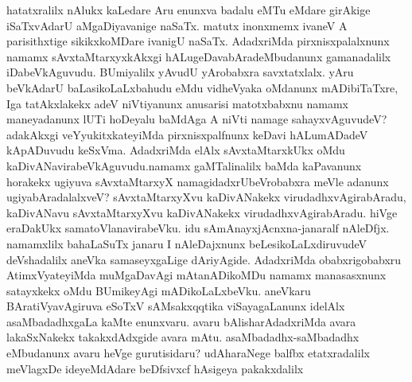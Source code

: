 hatatxralilx nAlukx kaLedare Aru enunxva badalu eMTu eMdare girAkige iSaTxvAdarU aMgaDiyavanige naSaTx. matutx inonxmemx ivaneV A pari\-sithxtige sikikx\-koMDare ivanigU naSaTx. AdadxriMda pirxnisxpalalxnunx namamx sAvxtaMtarxyx\-kAkxgi hALugeDavabAradeMbudanunx gamanadalilx iDabeVkAguvudu. BUmiyalilx yAvudU yArobabxra savxtatxlalx. yAru beVkAdarU baLasi\-koLaLx\-bahudu eMdu vidheVyaka oMdanunx mADibiTaTxre, Iga tatAkxlakekx adeV niVtiyanunx anu\-sarisi matotx\-babxnu namamx maneyadanunx lUTi hoDeyalu baMdAga A niVti namage sahayxvAgu\-vudeV? adakAkxgi veYyukitxkateyiMda pirxnisxpalfnunx keDavi hALumADadeV kApADu\-vudu keSxVma. AdadxriMda elAlx sAvxtaM\-tarxkUkx oMdu kaDivANavirabeVkAguvudu.\break \hbox{namamx} gaMTalinalilx baMda kaPa\-vanunx horakekx ugi\-yuva sAvx\-taMtarxyX nama\-gidadxrU\break beVro\-babxra meVle adanunx ugiyabAradalalxveV? sAvxtaMtarxyXvu kaDivANakekx virudadhx\-vAgira\-bAradu, kaDivANavu sAvxtaMtarxyXvu kaDivANakekx virudadhxvAgirabAradu. hiVge eraDakUkx sama\-toVlana\-vira\-beVku. idu sAmAnayxjAcnxna-janaralf nAleDfjx. namamxlilx bahaLaSuTx janaru I nAleDajxnunx beLesi\-koLaLx\-diruvudeV deVshadalilx aneVka samaseyx\-gaLige dAriyAgide. AdadxriMda obabxrigobabxru AtimxVyate\-yiMda muMgaDavAgi mAtanADikoMDu namamx manasasxnunx satayxkekx oMdu BUmikeyAgi mADikoLaLxbeVku. aneV\-karu BAratiVyavAgiruva eSoTxV sAMsakxqqtika viSayagaLanunx idelAlx asaMbadadhx\-gaLa kaMte enunxvaru. avaru bA\-lisharAdadxriMda avara lakaSxNakekx takakxdAdxgide avara mAtu. asaMbadadhx-saMbadadhx eMbudanunx avaru heVge gurutisidaru? udA\-haraNege balfbx etatxradalilx meVlagxDe ideyeMdAdare beDfsivxcf hAsigeya pakakx\-dalilx 
